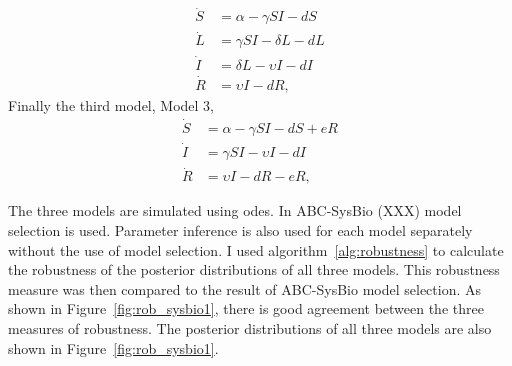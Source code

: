{%
\begin{align*}
\dot S &= \alpha - \gamma SI - dS \\
\dot L &= \gamma SI - \delta L - dL \\
\dot I &= \delta L - \upsilon I - dI \\
\dot R &= \upsilon I - dR,
\end{align*}
Finally the third model, Model 3, 
\begin{align*}
\dot S &= \alpha - \gamma SI - dS + eR\\
\dot I &= \gamma SI - \upsilon I - dI \\
\dot R &= \upsilon I - dR - eR,
\end{align*}

The three models are simulated using \acrshort{ode}s. In ABC-SysBio (XXX) model selection is used. Parameter inference is also used for each model separately without the use of model selection. I used algorithm~\ref{alg:robustness} to calculate the robustness of the posterior distributions of all three models. This robustness measure was then compared to the result of ABC-SysBio model selection. As shown in Figure~\ref{fig:rob_sysbio1}, there is good agreement between the three measures of robustness. The posterior distributions of all three models are also shown in Figure~\ref{fig:rob_sysbio1}.

}
